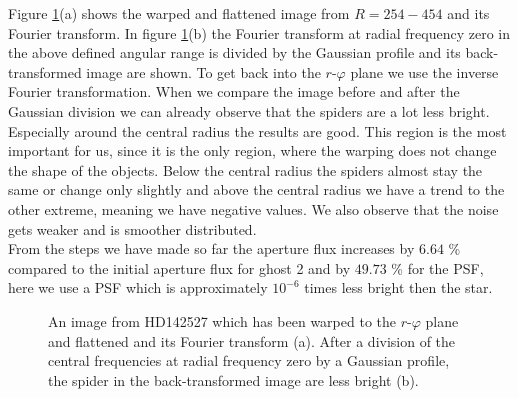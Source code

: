 Figure \ref{fig:HDsuppcentralfreq_R254_R454_-0.5to0.5}(a) shows the warped and flattened image from $R=254-454$ and its Fourier transform. In figure \ref{fig:HDsuppcentralfreq_R254_R454_-0.5to0.5}(b) the Fourier transform at radial frequency zero in the above defined angular range is divided by the Gaussian profile and its back-transformed image are shown. To get back into the $r$-$\varphi$ plane we use the inverse Fourier transformation. When we compare the image before and after the Gaussian division we can already observe that the spiders are a lot less bright. Especially around the central radius the results are good. This region is the most important for us, since it is the only region, where the warping does not change the shape of the objects. Below the central radius the spiders almost stay the same or change only slightly and above the central radius we have a trend to the other extreme, meaning we have negative values. We also observe that the noise gets weaker and is smoother distributed.\\
From the steps we have made so far the aperture flux increases by $6.64$ \% compared to the initial aperture flux for ghost 2 and by $49.73$ \% for the PSF, here we use a PSF which is approximately $10^{-6}$ times less bright then the star. 
\begin{figure}[H]
	\centering
\caption{An image from HD142527 which has been warped to the $r$-$\varphi$ plane and flattened and its Fourier transform (a). After a division of the central frequencies at radial frequency zero by a Gaussian profile, the spider in the back-transformed image are less bright (b).}
\label{fig:HDsuppcentralfreq_R254_R454_-0.5to0.5}
\end{figure}

